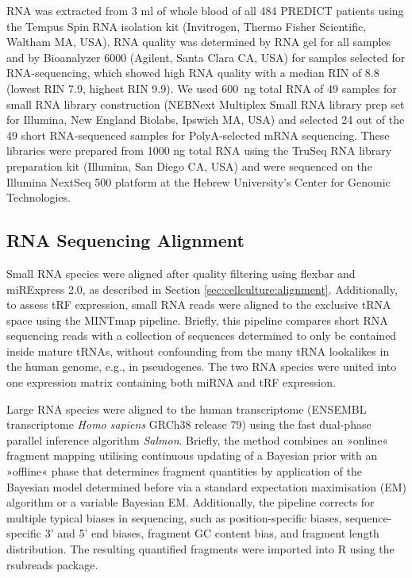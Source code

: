 \begin{method}
RNA was extracted from 3 ml of whole blood of all 484 PREDICT patients using the Tempus Spin RNA isolation kit (Invitrogen, Thermo Fisher Scientific, Waltham MA, USA). RNA quality was determined by RNA gel for all samples and by Bioanalyzer 6000 (Agilent, Santa Clara CA, USA) for samples selected for RNA-sequencing, which showed high RNA quality with a median RIN of 8.8 (lowest RIN 7.9, highest RIN 9.9). We used 600 ng total RNA of 49 samples for small RNA library construction (NEBNext Multiplex Small RNA library prep set for Illumina, New England Biolabs, Ipswich MA, USA) and selected 24 out of the 49 short RNA-sequenced samples for PolyA-selected mRNA sequencing. These libraries were prepared from 1000 ng total RNA using the TruSeq RNA library preparation kit (Illumina, San Diego CA, USA) and were sequenced on the Illumina NextSeq 500 platform at the Hebrew University’s Center for Genomic Technologies.

\subsection{RNA Sequencing Alignment} \label{sec:stroke:alignment}
Small RNA species were aligned after quality filtering using flexbar and miRExpress 2.0, as described in Section \ref{sec:cellculture:alignment}. Additionally, to assess tRF expression, small RNA reads were aligned to the exclusive tRNA space using the MINTmap pipeline.\cite{Loher2017} Briefly, this pipeline compares short RNA sequencing reads with a collection of sequences determined to only be contained inside mature tRNAs, without confounding from the many tRNA lookalikes in the human genome, e.g., in pseudogenes. The two RNA species were united into one expression matrix containing both miRNA and tRF expression.

Large RNA species were aligned to the human transcriptome (ENSEMBL transcriptome \emph{Homo sapiens} GRCh38 release 79) using the fast dual-phase parallel inference algorithm \emph{Salmon}.\cite{Patro2017} Briefly, the method combines an »online« fragment mapping utilising continuous updating of a Bayesian prior with an »offline« phase that determines fragment quantities by application of the Bayesian model determined before via a standard expectation maximisation (EM) algorithm or a variable Bayesian EM. Additionally, the pipeline corrects for multiple typical biases in sequencing, such as position-specific biases, sequence-specific 3' and 5' end biases, fragment GC content bias, and fragment length distribution. The resulting quantified fragments were imported into R using the rsubreads package.\cite{Liao2019}


\end{method}
